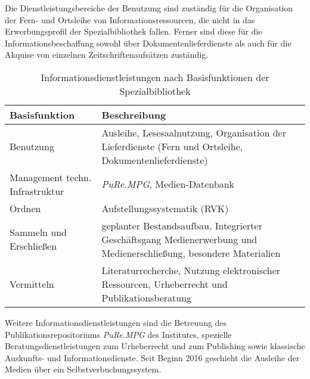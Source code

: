Die Dienstleistungsbereiche der Benutzung sind zuständig für die Organisation der Fern- und Ortsleihe 
von Informationsressourcen, die nicht in das Erwerbungsprofil der Spezialbibliothek fallen. Ferner sind diese 
für die Informationsbeschaffung sowohl über Dokumentenlieferdienste als auch für die Akquise von einzelnen Zeitschriftenaufsätzen zuständig.

\begingroup
\setlength{\tabcolsep}{12pt} %
\renewcommand{\arraystretch}{1.5} 
\begin{table}[h]
    \centering
    \begin{adjustbox}{max width=\textwidth}
    \begin{tabular}{p{}p{}}
       \toprule
       \textbf{Basisfunktion}          & \textbf{Beschreibung}\\
       \midrule
        Benutzung                               &Ausleihe, Lesesaalnutzung, Organisation der Lieferdienste (Fern und Ortsleihe, Dokumentenlieferdienste)\\
        Management techn. Infrastruktur         &\textit{\acrshort{PuRe.MPG}}, Medien-Datenbank\\
        Ordnen                                  &Aufstellungssystematik (RVK)\\
        Sammeln und Erschließen                 &geplanter Bestandsaufbau, Integrierter Geschäftsgang Medienerwerbung und Medienerschließung, besondere Materialien\\
        Vermitteln                              &Literaturrecherche, Nutzung elektronischer Ressourcen, Urheberrecht und Publikationsberatung\\
   
       \bottomrule
    \end{tabular}
    \end{adjustbox}
    \caption{%
        Informationsdienstleistungen nach Basisfunktionen der Spezialbibliothek
    }
    \label{tab:Informationsdienstleistungen}
    \end{table}
\endgroup

Weitere Informationsdienstleistungen sind die Betreuung des Publikationsrepositoriums \textit{\acrshort{PuRe.MPG}} des Institutes, spezielle Beratungsdienstleistungen 
zum Urheberrecht und zum Publishing sowie klassische Auskunfts- und Informationsdienste. Seit Beginn 2016 
geschieht die Ausleihe der Medien über ein Selbstverbuchungssystem.\\

